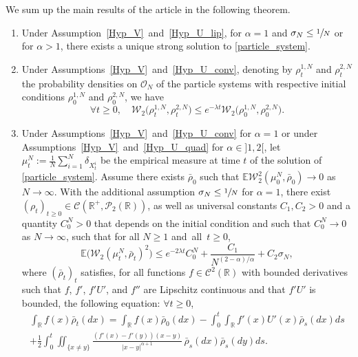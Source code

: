 We sum up the main results of the article in the following theorem.

\skpt
\begin{theorem}\label{thm_resume}
\begin{enumerate}\renewcommand{\theenumi}{\Alph{enumi}}
\item\label{thm_resumeA}
Under Assumption~\ref{Hyp_V}~and~\ref{Hyp_U_lip}, for $\alpha=1$ and $\sigma_N\leq\sfrac{1}{N}$ or for $\alpha>1$, there exists a unique strong solution to \eqref{particle_system}.

\item\label{thm_resumeB}
Under Assumptions~\ref{Hyp_V}~and~\ref{Hyp_U_conv}, denoting by $\rho^{1,N}_t$ and $\rho^{2,N}_t$ the probability densities on $\mathcal{O}_N$ of the particle systems with respective initial conditions $\rho^{1,N}_0$ and $\rho^{2,N}_0$, we have\vspace*{-3pt}
\begin{equation*}
\forall t\geq0,\quad \mathcal{W}_2\bigl(\rho^{1,N}_t,\rho^{2,N}_t\bigr)\leq e^{-\lambda t}\mathcal{W}_2\bigl(\rho^{1,N}_0,\rho^{2,N}_0\bigr).
\end{equation*}

\item\label{thm_resumeC}
Under Assumptions~\ref{Hyp_V}~and~\ref{Hyp_U_conv} for $\alpha=1$ or under Assumptions~\ref{Hyp_V}~and~\ref{Hyp_U_quad} for $\alpha\in{}]1,2[$, let $\mu^N_t:=\frac{1}{N}\sum_{i=1}^N\delta_{X^i_t}$ be the empirical measure at time $t$ of the solution of \eqref{particle_system}. Assume there exists $\bar{\rho}_0$ such that $\mathbb{E}\mathcal{W}^2_2(\mu^N_0,\bar{\rho}_0)\to 0$ as $N\to\infty$. With the additional assumption $\sigma_N\leq\sfrac{1}{N}$ for $\alpha=1$, there exist $(\rho_t)_{t\geq 0}\in\mathcal{C}(\mathbb{R}^+,\mathcal{P}_2(\mathbb{R}))$, as well as universal constants $C_1,C_2>0$ and a quantity $C_0^N>0$ that depends on the initial condition and such that $C_0^N\!\to\!0$ as $N\!\to\!\infty$, such that for all $N\!\geq\!1$ and~all~\hbox{$t\geq0$},\vspace*{-3pt}
\[
\mathbb{E}\bigl(\mathcal{W}_2(\mu^N_t,\bar{\rho}_t)^2\bigr)\leq e^{-2\lambda t}C_0^N+\frac{C_1}{N^{(2-\alpha)/\alpha}}+C_2\sigma_N,
\]
where $(\bar{\rho}_t)_t$ satisfies, for all functions $f\in\mathcal{C}^2(\mathbb{R})$ with bounded derivatives such that $f$, $f'$, $f'U'$, and $f''$ are Lipschitz continuous and that $f'U'$ is bounded, the following equation: $\forall t\geqslant 0$,\vspace*{-5pt}
\begin{multline*}
\int_{\mathbb{R}}f(x)\bar{\rho}_t(dx)=\int_{\mathbb{R}}f(x)\bar{\rho}_0(dx)-\int_{0}^t\int_{\mathbb{R}}f'(x)U'(x)\bar{\rho}_s(dx)ds\\
+\frac{1}{2}\int_{0}^t\iint_{\{x\neq y\}}\frac{(f'(x)-f'(y))(x-y)}{|x-y|^{\alpha+1}}\,\bar{\rho}_s(dx)\bar{\rho}_s(dy)ds.
\end{multline*}
\end{enumerate}
\end{theorem}

